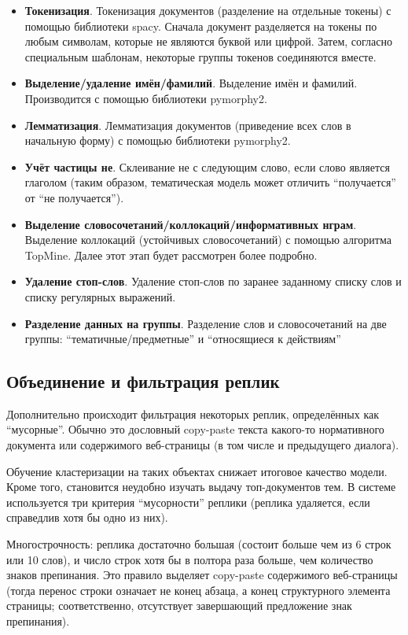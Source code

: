 \begin{itemize}

\item \textbf{Токенизация}. Токенизация документов (разделение на отдельные токены) с помощью библиотеки spacy. Сначала документ разделяется на токены по любым символам, которые не являются буквой или цифрой. Затем, согласно специальным шаблонам, некоторые группы токенов соединяются вместе.
\item \textbf{Выделение/удаление имён/фамилий}. Выделение имён и фамилий. Производится с помощью библиотеки pymorphy2.
\item \textbf{Лемматизация}. Лемматизация документов (приведение всех слов в начальную форму) с помощью библиотеки pymorphy2. 
\item \textbf{Учёт частицы не}. Склеивание не с следующим слово, если слово является глаголом (таким образом, тематическая модель может отличить ``получается'' от ``не получается'').
\item \textbf{Выделение словосочетаний/коллокаций/информативных нграм}. Выделение коллокаций (устойчивых словосочетаний) с помощью алгоритма TopMine. Далее этот этап будет рассмотрен более подробно.
\item \textbf{Удаление стоп-слов}. Удаление стоп-слов по заранее заданному списку слов и списку регулярных выражений.
\item \textbf{Разделение данных на группы}. Разделение слов и словосочетаний на две группы: “тематичные/предметные” и “относящиеся к действиям”
\end{itemize}

\subsection{Объединение и фильтрация реплик} 

Дополнительно происходит фильтрация некоторых реплик, определённых как “мусорные”. Обычно это дословный copy-paste текста какого-то нормативного документа или содержимого веб-страницы (в том числе и предыдущего диалога). 

Обучение кластеризации на таких объектах снижает итоговое качество модели. Кроме того, становится неудобно изучать выдачу топ-документов тем. В системе используется три критерия “мусорности” реплики (реплика удаляется, если справедлив хотя бы одно из них).


Многострочность: реплика достаточно большая (состоит больше чем из 6 строк или 10 слов), и число строк хотя бы в полтора раза больше, чем количество знаков препинания. Это правило выделяет copy-paste содержимого веб-страницы (тогда перенос строки означает не конец абзаца, а конец структурного элемента страницы; соответственно, отсутствует завершающий предложение знак препинания).

